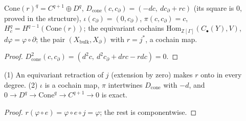 \begin{definition}\label{def:pair}
  \leanok
  $\mathrm{Cone}(r)^q=C^{q+1}\oplus D^q$, $D_{\mathrm{cone}}(c,c_\partial)=(-dc,\ dc_\partial+rc)$ (its square is $0$, proved in the
  structure), $\iota(c_\partial)=(0,c_\partial)$, $\pi(c,c_\partial)=c$, $H^q_c=H^{q-1}(\mathrm{Cone}(r))$; the equivariant cochains
  $\mathrm{Hom}_{\mathbb Z[\Gamma]}(C_\bullet(Y),V)$, $d\varphi=\varphi\circ\partial$; the pair $(X_{\mathrm{bulk}},X_\partial)$ with
  $r=j^*$, a cochain map.
\end{definition}
\begin{proof}
  \leanok
  $D_{\mathrm{cone}}^2(c,c_\partial)=(d^2c,\ d^2c_\partial+drc-rdc)=0$.
\end{proof}

\begin{lemma}\label{lem:conerelative-12}
  \leanok
  (1) An equivariant retraction of $j$ (extension by zero) makes $r$ onto in every degree. (2) $\iota$ is a cochain map, $\pi$
  intertwines $D_{\mathrm{cone}}$ with $-d$, and $0\to D^q\to\mathrm{Cone}^q\to C^{q+1}\to0$ is exact.
\end{lemma}
\begin{proof}
  \leanok
  $r(\varphi\circ e)=\varphi\circ e\circ j=\varphi$; the rest is componentwise.
\end{proof}

